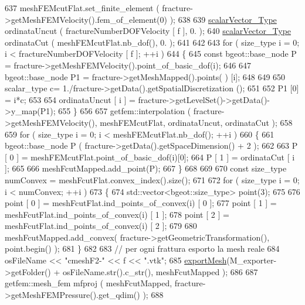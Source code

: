 \begin{DoxyCode}
637         meshFEMcutFlat.set\_finite\_element ( fracture->getMeshFEMVelocity().fem\_of\_element(0) );
638 
639         \hyperlink{Core_8h_a4e75b5863535ba1dd79942de2846eff0}{scalarVector\_Type} ordinataUncut ( fractureNumberDOFVelocity [ f ], 0. );
640         \hyperlink{Core_8h_a4e75b5863535ba1dd79942de2846eff0}{scalarVector\_Type} ordinataCut ( meshFEMcutFlat.nb\_dof(), 0. );
641 
642     
643         \textcolor{keywordflow}{for} ( size\_type i = 0; i < fractureNumberDOFVelocity [ f ]; ++i )
644         \{
645             \textcolor{keyword}{const} bgeot::base\_node P = fracture->getMeshFEMVelocity().point\_of\_basic\_dof(i);
646 
647             bgeot::base\_node P1 = fracture->getMeshMapped().points( ) [i];
648 
649 
650             scalar\_type c= 1./fracture->getData().getSpatialDiscretization ();
651 
652             P1 [0] =  i*c;
653 
654             ordinataUncut [ i ] = fracture->getLevelSet()->getData()->y\_map(P1);
655         \}
656 
657         getfem::interpolation ( fracture->getMeshFEMVelocity(), meshFEMcutFlat, ordinataUncut, ordinataCut 
      );
658 
659         \textcolor{keywordflow}{for} ( size\_type i = 0; i < meshFEMcutFlat.nb\_dof(); ++i )
660         \{
661             bgeot::base\_node P ( fracture->getData().getSpaceDimension() + 2 );
662             
663             P [ 0 ] = meshFEMcutFlat.point\_of\_basic\_dof(i)[0];
664             P [ 1 ] = ordinataCut [ i ];
665             
666             meshFcutMapped.add\_point(P);
667         \}
668 
669 
670         \textcolor{keyword}{const} size\_type numConvex = meshFcutFlat.convex\_index().size();
671 
672         \textcolor{keywordflow}{for} ( size\_type i = 0; i < numConvex; ++i )
673         \{
674             std::vector<bgeot::size\_type> point(3);
675            
676             point [ 0 ] = meshFcutFlat.ind\_points\_of\_convex(i) [ 0 ];
677             point [ 1 ] = meshFcutFlat.ind\_points\_of\_convex(i) [ 1 ];
678             point [ 2 ] = meshFcutFlat.ind\_points\_of\_convex(i) [ 2 ];
679             
680             meshFcutMapped.add\_convex( fracture->getGeometricTransformation(), point.begin() );
681         \}
682 
683         \textcolor{comment}{// per ogni frattura esporto la mesh reale}
684         osFileName << \textcolor{stringliteral}{"cmeshF2-"} << f << \textcolor{stringliteral}{".vtk"};
685         \hyperlink{UsefulFunctions_8h_ae4bd400c144e72bee180107bb41ae72a}{exportMesh}(M\_exporter->getFolder() + osFileName.str().c\_str(), meshFcutMapped );
686 
687         getfem::mesh\_fem mfproj ( meshFcutMapped, fracture->getMeshFEMPressure().get\_qdim() );
688 

\end{DoxyCode}
